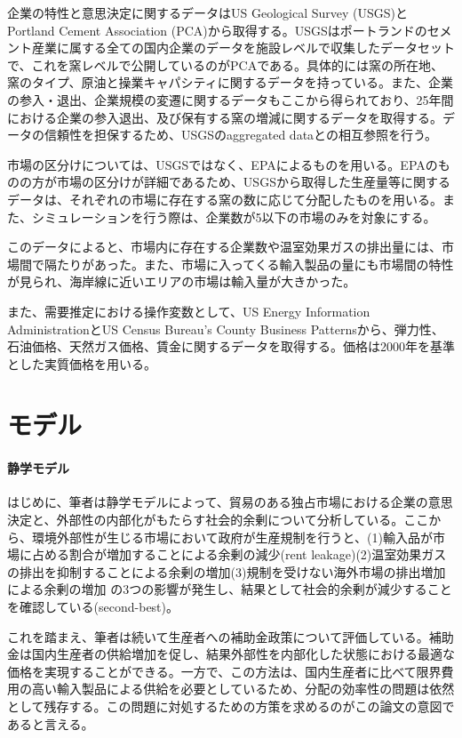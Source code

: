 \documentclass[11pt]{jsarticle}
\begin{document}
企業の特性と意思決定に関するデータはUS Geological Survey (USGS)とPortland Cement Association (PCA)から取得する。USGSはポートランドのセメント産業に属する全ての国内企業のデータを施設レベルで収集したデータセットで、これを窯レベルで公開しているのがPCAである。具体的には窯の所在地、窯のタイプ、原油と操業キャパシティに関するデータを持っている。また、企業の参入・退出、企業規模の変遷に関するデータもここから得られており、25年間における企業の参入退出、及び保有する窯の増減に関するデータを取得する。データの信頼性を担保するため、USGSのaggregated dataとの相互参照を行う。

市場の区分けについては、USGSではなく、EPAによるものを用いる。EPAのものの方が市場の区分けが詳細であるため、USGSから取得した生産量等に関するデータは、それぞれの市場に存在する窯の数に応じて分配したものを用いる。また、シミュレーションを行う際は、企業数が5以下の市場のみを対象にする。

このデータによると、市場内に存在する企業数や温室効果ガスの排出量には、市場間で隔たりがあった。また、市場に入ってくる輸入製品の量にも市場間の特性が見られ、海岸線に近いエリアの市場は輸入量が大きかった。

また、需要推定における操作変数として、US Energy Information AdministrationとUS Census Bureau's County Business Patternsから、弾力性、石油価格、天然ガス価格、賃金に関するデータを取得する。価格は2000年を基準とした実質価格を用いる。

\section{モデル}

\paragraph{静学モデル}

はじめに、筆者は静学モデルによって、貿易のある独占市場における企業の意思決定と、外部性の内部化がもたらす社会的余剰について分析している。ここから、環境外部性が生じる市場において政府が生産規制を行うと、(1)輸入品が市場に占める割合が増加することによる余剰の減少(rent leakage)(2)温室効果ガスの排出を抑制することによる余剰の増加(3)規制を受けない海外市場の排出増加による余剰の増加 の3つの影響が発生し、結果として社会的余剰が減少することを確認している(second-best)。

これを踏まえ、筆者は続いて生産者への補助金政策について評価している。補助金は国内生産者の供給増加を促し、結果外部性を内部化した状態における最適な価格を実現することができる。一方で、この方法は、国内生産者に比べて限界費用の高い輸入製品による供給を必要としているため、分配の効率性の問題は依然として残存する。この問題に対処するための方策を求めるのがこの論文の意図であると言える。
\end{document}
